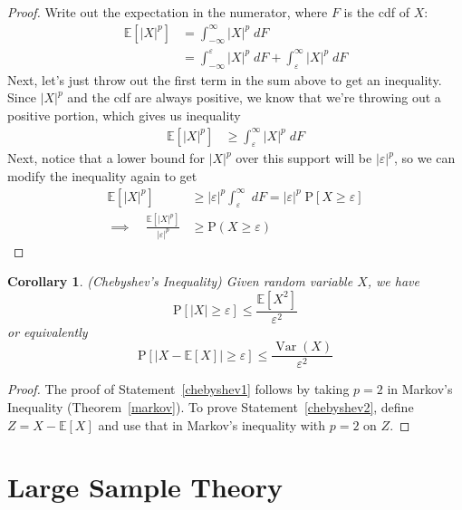 \documentclass[12pt]{article}
\theoremstyle{plain}
\newtheorem{cor}[thm]{Corollary}
\theoremstyle{definition}
\theoremstyle{remark}
\newcommand{\Prb}{\mathrm{P}}
\newcommand{\E}{\mathbb{E}}
\newcommand{\Var}{\operatorname{Var}}
\begin{document}
\begin{proof}
Write out the expectation in the numerator, where $F$ is the cdf of $X$:
\begin{align*}
  \E\left[|X|^p\right]
  &= \int^\infty_{-\infty} |X|^p \; dF \\
  &= \int^{\varepsilon}_{-\infty} |X|^p \; dF
    + \int^\infty_{\varepsilon} |X|^p \; dF
\end{align*}
Next, let's just throw out the first term in the sum above to get an
inequality. Since $|X|^p$ and the cdf are always positive, we know that
we're throwing out a positive portion, which gives us inequality
\begin{align*}
  \E\left[|X|^p\right]
  &\geq \int^\infty_{\varepsilon} |X|^p \; dF
\end{align*}
Next, notice that a lower bound for $|X|^p$ over this support will be
$|\varepsilon|^p$, so we can modify the inequality again to get
\begin{align*}
  \E\left[|X|^p\right]
  &\geq  |\varepsilon|^p \int^\infty_{\varepsilon} \; dF
  = |\varepsilon|^p \; \Prb[X\geq \varepsilon] \\
  \implies \quad
  \frac{\E\left[|X|^p\right]}{|\varepsilon|^p}
  &\geq \Prb(X\geq \varepsilon)
\end{align*}
\end{proof}

\begin{cor}{\emph{(Chebyshev's Inequality)}}
Given random variable $X$, we have
\begin{equation}
  \label{chebyshev1}
  \Prb\left[
    \left\lvert X\right\rvert
    \geq \varepsilon\right]
  \leq \frac{\E\left[X^2\right]}{\varepsilon^2}
\end{equation}
or equivalently
\begin{equation}
  \label{chebyshev2}
  \Prb\left[
    \big\lvert X-\E[X]\big\rvert
    \geq \varepsilon\right]
  \leq \frac{\Var(X)}{\varepsilon^2}
\end{equation}
\end{cor}
\begin{proof}
The proof of Statement~\ref{chebyshev1} follows by taking $p=2$ in
Markov's Inequality (Theorem~\ref{markov}).
To prove Statement~\ref{chebyshev2}, define $Z=X-\E[X]$ and use that in
Markov's inequality with $p=2$ on $Z$.
\end{proof}

\clearpage
\section{Large Sample Theory}
\end{document}
